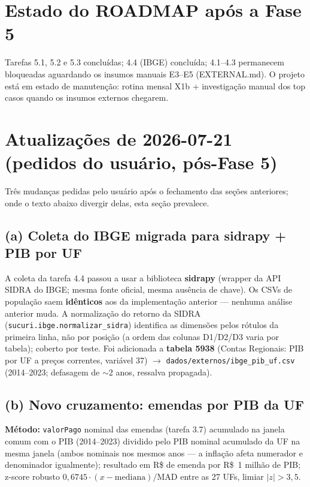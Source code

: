 \documentclass[11pt,a4paper]{article}
\begin{document}
\section{Estado do ROADMAP após a Fase 5}

Tarefas 5.1, 5.2 e 5.3 concluídas; 4.4 (IBGE) concluída; 4.1--4.3
permanecem bloqueadas aguardando os insumos manuais E3--E5 (EXTERNAL.md).
O projeto está em estado de manutenção: rotina mensal X1b + investigação
manual dos top casos quando os insumos externos chegarem.

\section{Atualizações de 2026-07-21 (pedidos do usuário, pós-Fase 5)}

Três mudanças pedidas pelo usuário após o fechamento das seções
anteriores; onde o texto abaixo divergir delas, esta seção prevalece.

\subsection*{(a) Coleta do IBGE migrada para sidrapy + PIB por UF}

A coleta da tarefa 4.4 passou a usar a biblioteca \textbf{sidrapy}
(wrapper da API SIDRA do IBGE; mesma fonte oficial, mesma ausência de
chave). Os CSVs de população saem \textbf{idênticos} aos da implementação
anterior --- nenhuma análise anterior muda. A normalização do retorno da
SIDRA (\texttt{sucuri.ibge.normalizar\_sidra}) identifica as dimensões
pelos rótulos da primeira linha, não por posição (a ordem das colunas
D1/D2/D3 varia por tabela); coberto por teste. Foi adicionada a
\textbf{tabela 5938} (Contas Regionais: PIB por UF a preços correntes,
variável 37) $\rightarrow$ \texttt{dados/externos/ibge\_pib\_uf.csv}
(2014--2023; defasagem de ${\sim}$2 anos, ressalva propagada).

\subsection*{(b) Novo cruzamento: emendas por PIB da UF}

\textbf{Método:} \texttt{valorPago} nominal das emendas (tarefa 3.7)
acumulado na janela comum com o PIB (2014--2023) dividido pelo PIB
nominal acumulado da UF na mesma janela (ambos nominais nos mesmos anos
--- a inflação afeta numerador e denominador igualmente); resultado em
R\$ de emenda por R\$~1 milhão de PIB; z-score robusto
$0{,}6745\cdot(x-\mathrm{mediana})/\mathrm{MAD}$ entre as 27 UFs, limiar
$|z| > 3{,}5$.
\end{document}
